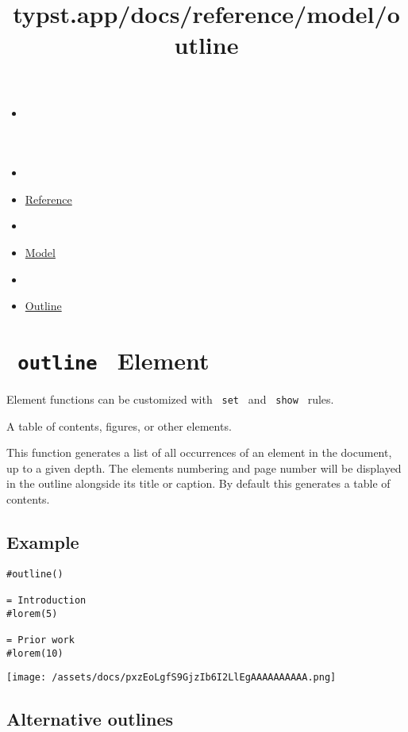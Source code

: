 \title{typst.app/docs/reference/model/outline}

\begin{itemize}
\tightlist
\item
  \href{/docs}{}
\item
  
\item
  \href{/docs/reference/}{Reference}
\item
  
\item
  \href{/docs/reference/model/}{Model}
\item
  
\item
  \href{/docs/reference/model/outline/}{Outline}
\end{itemize}

\section{\texorpdfstring{\texttt{\ outline\ } {{ Element
}}}{ outline   Element }}\label{summary}

\label{element-tooltip}
Element functions can be customized with \texttt{\ set\ } and
\texttt{\ show\ } rules.

A table of contents, figures, or other elements.

This function generates a list of all occurrences of an element in the
document, up to a given depth. The element\textquotesingle s numbering
and page number will be displayed in the outline alongside its title or
caption. By default this generates a table of contents.

\subsection{Example}\label{example}

\begin{verbatim}
#outline()

= Introduction
#lorem(5)

= Prior work
#lorem(10)
\end{verbatim}

\texttt{[image: /assets/docs/pxzEoLgfS9GjzIb6I2LlEgAAAAAAAAAA.png]}

\subsection{Alternative outlines}\label{alternative-outlines}

